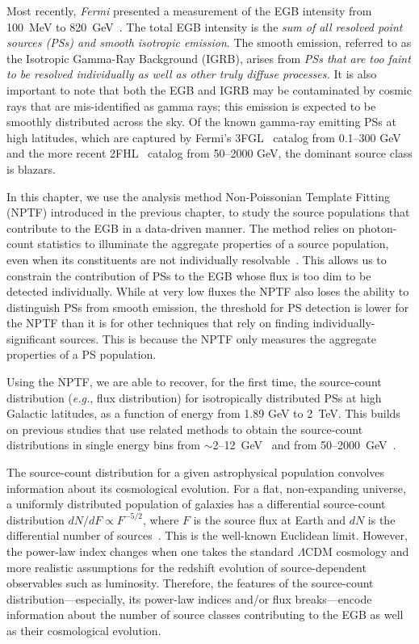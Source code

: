 Most recently, \emph{Fermi} presented a measurement of the EGB intensity from 100~MeV to 820~GeV~\cite{Ackermann:2014usa}. The total EGB intensity is the \textit{sum of all resolved point sources (PSs) and smooth isotropic emission}. The smooth emission, referred to as the Isotropic Gamma-Ray Background (IGRB), arises from \textit{PSs that are too faint to be resolved individually as well as other truly diffuse processes.}    It is also important to note that both the EGB and IGRB may be contaminated by cosmic rays that are mis-identified as gamma rays; this emission is expected to be smoothly distributed across the sky.
Of the known gamma-ray emitting PSs at high latitudes, which are captured by Fermi's 3FGL~\cite{Acero:2015hja} catalog from 0.1--300 GeV and the more recent 2FHL~\cite{Ackermann:2015uya} catalog from 50--2000 GeV, the dominant source class is blazars.

In this chapter, we use the analysis method Non-Poissonian Template Fitting (NPTF) introduced in the previous chapter, to study the source populations that contribute to the EGB in a data-driven manner.  The method relies on photon-count statistics to illuminate the aggregate properties of a source population, even when its constituents are not individually resolvable~\cite{Malyshev:2011zi,Lee:2014mza, Lee:2015fea}.  This allows us to constrain the contribution of PSs to the EGB whose flux is too dim to be detected individually.  While at very low fluxes the NPTF also loses the ability to distinguish PSs from smooth emission, the threshold for PS detection is lower for the NPTF than it is for other techniques that rely on finding individually-significant sources.  This is because the NPTF only measures the aggregate properties of a PS population. 

Using the NPTF, we are able to recover, for the first time, the source-count distribution (\emph{e.g.}, flux distribution) for isotropically distributed PSs at high Galactic latitudes, as a function of energy from 1.89 GeV to 2~TeV.  This builds on previous studies that use related methods to obtain the source-count distributions in single energy bins from $\sim$2--12~GeV~\cite{Zechlin:2015wdz,Lee:2015fea} and from 50--2000~GeV~\cite{TheFermi-LAT:2015ykq}. 

The source-count distribution for a given astrophysical population convolves information about its cosmological evolution.  For a flat, non-expanding universe, a uniformly distributed population of galaxies has a differential source-count distribution $dN/dF \propto F^{-5/2}$, where $F$ is the source flux at Earth and $dN$ is the differential number of sources~\cite{Sandage}.  This is the well-known Euclidean limit.  However, the power-law index changes when one takes the standard $\Lambda$CDM cosmology and more realistic assumptions for the redshift evolution of source-dependent observables such as luminosity.  Therefore, the features of the source-count distribution---especially, its power-law indices and/or flux breaks---encode information about the number of source classes contributing to the EGB as well as their cosmological evolution.

